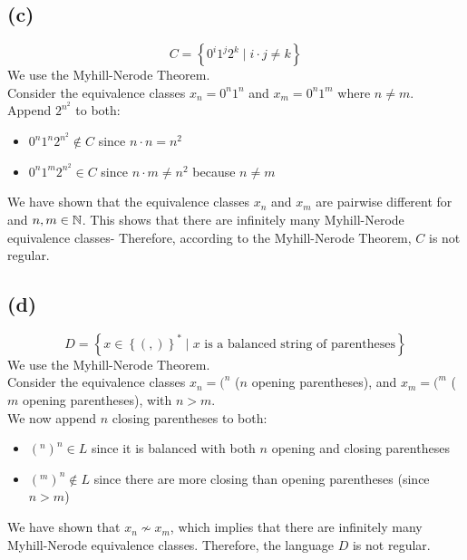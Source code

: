\subsection{(c)}
$$C = \left\{ 0^{i}1^{j}2^{k} \mid i\cdot j \neq k \right\}$$
We use the Myhill-Nerode Theorem.\\
Consider the equivalence classes $x_{n} = 0^{n}1^{n}$ and $x_{m} = 0^{n}1^{m}$ where $n\neq m$.\\
Append $2^{n^{2}}$ to both:
\begin{itemize}
    \item $0^{n}1^{n}2^{n^{2}} \notin C$ since $n \cdot n = n^{2}$
    \item $0^{n}1^{m}2^{n^{2}} \in C$ since $n \cdot m \neq n^{2}$ because $n \neq m$
\end{itemize}
We have shown that the equivalence classes $x_{n}$ and $x_{m}$ are pairwise different for and $n,m \in \mathbb{N}$. This shows that there are infinitely many Myhill-Nerode equivalence classes- Therefore, according to the Myhill-Nerode Theorem, $C$ is not regular.


\subsection{(d)}
$$D = \left\{ x \in \left\{(,)\right\}^{\ast} \mid x \text{ is a balanced string of parentheses} \right\}$$
We use the Myhill-Nerode Theorem.\\
Consider the equivalence classes $x_{n} = (^{n}$ ($n$ opening parentheses), and $x_{m} = (^{m}$ ($m$ opening parentheses), with $n>m$.\\
We now append $n$ closing parentheses to both:\\
\begin{itemize}
    \item $(^{n})^{n} \in L$ since it is balanced with both $n$ opening and closing parentheses
    \item $(^{m})^{n} \notin L$ since there are more closing than opening parentheses (since $n>m$)
\end{itemize}
We have shown that $x_{n} \nsim x_{m}$, which implies that there are infinitely many Myhill-Nerode equivalence classes. Therefore, the language $D$ is not regular.


